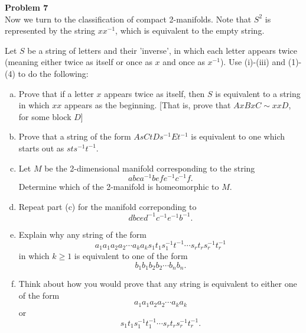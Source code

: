 \documentclass[a4paper, 12pt]{article}
\newenvironment{problem}[2][Problem]
    { \begin{mdframed}[backgroundcolor=gray!20] \textbf{#1 #2} \\}
    {  \end{mdframed}}
\begin{document}
\begin{problem}{7}
Now we turn to the classification of compact 2-manifolds. Note that \(S^2\) is represented by the string \(xx^{-1}\), which is equivalent to the empty string.

Let \(S\) be a string of letters and their 'inverse', in which each letter appears twice (meaning either twice as itself or once as \(x\) and once as \(x^{-1}\)). Use (i)-(iii) and (1)-(4) to do the following:
\begin{enumerate}[(a)]
\item Prove that if a letter \(x\) appears twice as itself, then \(S\) is equivalent to a string in which \(xx\) appears as the beginning. [That is, prove that \(AxBxC\sim xxD\), for some block \(D\)]
\item Prove that a string of the form \(AsCtDs^{-1}Et^{-1}\) is equivalent to one which starts out as \(sts^{-1}t^{-1}\).
\item Let \(M\) be the 2-dimensional manifold corresponding to the string 
\[abca^{-1}befe^{-1}c^{-1}f.\]
Determine which of the 2-manifold is homeomorphic to \(M\).
\item Repeat part (c) for the manifold correponding to 
\[dbced^{-1}c^{-1}e^{-1}b^{-1}.\]
\item Explain why any string of the form 
\[a_1a_1a_2a_2\cdots a_ka_ks_1t_1s_1^{-1}t^{-1}\cdots s_rt_rs_r^{-1}t_r^{-1}\]
in which \(k\geq 1\) is equivalent to one of the form 
\[b_1b_1b_2b_2\cdots b_nb_n.\]
\item Think about how you would prove that any string is equivalent to either one of the form 
\[a_1a_1a_2a_2\cdots a_ka_k\]
or 
\[s_1t_1s_1^{-1}t_1^{-1}\cdots s_rt_rs_r^{-1}t_r^{-1}.\]
\end{enumerate}
\end{problem}
\end{document}
